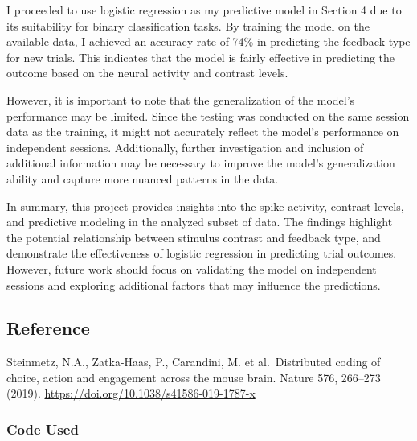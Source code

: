 \documentclass[
]{article}
\begin{document}
I proceeded to use logistic regression as my predictive model in Section
4 due to its suitability for binary classification tasks. By training
the model on the available data, I achieved an accuracy rate of 74\% in
predicting the feedback type for new trials. This indicates that the
model is fairly effective in predicting the outcome based on the neural
activity and contrast levels.

However, it is important to note that the generalization of the model's
performance may be limited. Since the testing was conducted on the same
session data as the training, it might not accurately reflect the
model's performance on independent sessions. Additionally, further
investigation and inclusion of additional information may be necessary
to improve the model's generalization ability and capture more nuanced
patterns in the data.

In summary, this project provides insights into the spike activity,
contrast levels, and predictive modeling in the analyzed subset of data.
The findings highlight the potential relationship between stimulus
contrast and feedback type, and demonstrate the effectiveness of
logistic regression in predicting trial outcomes. However, future work
should focus on validating the model on independent sessions and
exploring additional factors that may influence the predictions.

\subsection*{Reference}\label{reference}

Steinmetz, N.A., Zatka-Haas, P., Carandini, M. et al.~Distributed coding
of choice, action and engagement across the mouse brain. Nature 576,
266--273 (2019). \url{https://doi.org/10.1038/s41586-019-1787-x}

\subsubsection{Code Used}\label{code-used}
\end{document}
